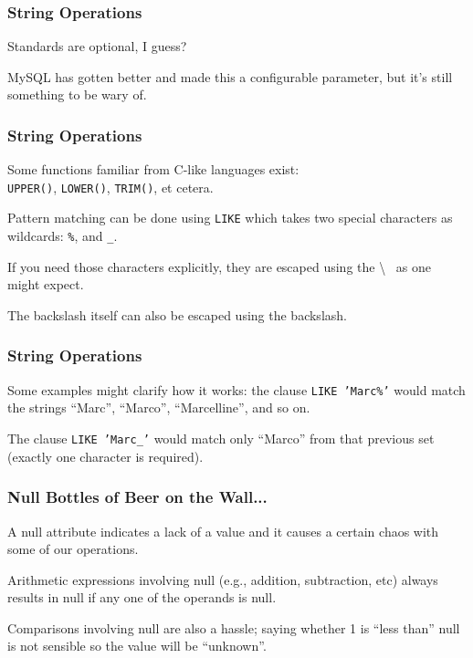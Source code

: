 \begin{frame}
\frametitle{String Operations}


Standards are optional, I guess? 

MySQL has gotten better and made this a configurable parameter, but it's still something to be wary of.


\end{frame}



\begin{frame}
\frametitle{String Operations}

Some functions familiar from C-like languages exist:\\
\quad  \texttt{UPPER()}, \texttt{LOWER()}, \texttt{TRIM()}, et cetera. 

Pattern matching can be done using \texttt{LIKE} which takes two special characters as wildcards: \texttt{\%}, and \texttt{\_}.  

If you need those characters explicitly, they are escaped using the \textbackslash~ as one might expect. 

The backslash itself can also be escaped using the backslash.

\end{frame}


\begin{frame}
\frametitle{String Operations}

Some examples might clarify how it works: the clause \texttt{LIKE 'Marc\%'} would match the strings ``Marc'', ``Marco'', ``Marcelline'', and so on. 

The clause \texttt{LIKE 'Marc\_'} would match only ``Marco'' from that previous set (exactly one character is required). 


\end{frame}



\begin{frame}
\frametitle{Null Bottles of Beer on the Wall...}

A null attribute indicates a lack of a value and it causes a certain chaos with some of our operations.

Arithmetic expressions involving null (e.g., addition, subtraction, etc) always results in null if any one of the operands is null. 

Comparisons involving null are also a hassle; saying whether 1 is ``less than'' null is not sensible so the value will be ``unknown''.

\end{frame}



